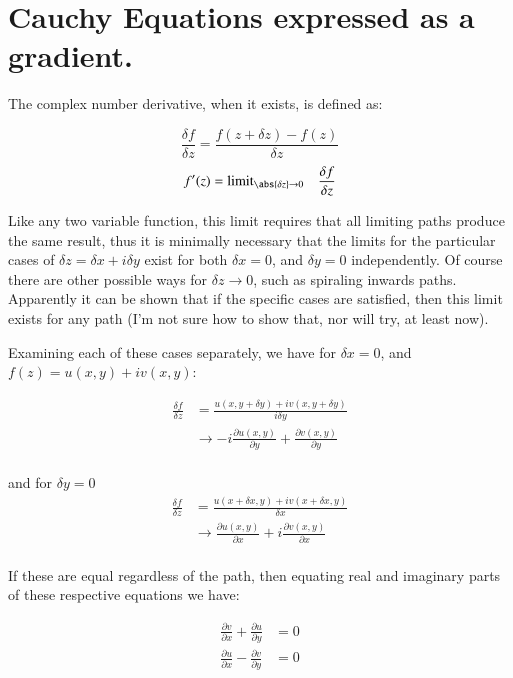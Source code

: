 \chapter{Cauchy Equations expressed as a gradient.}
\date{August 13, 2008.  Last Revision: $Date: 2009/06/04 13:13:27 $ }

The complex number derivative, when it exists, is defined as:

\begin{equation*}
\frac{\delta f}{\delta z} = \frac{ f(z + \delta z) - f(z)}{\delta z}
\end{equation*}
\begin{equation*}
f'(z) = {\text{limit}}_{\abs{\delta z} \rightarrow 0} \quad \frac{\delta f}{\delta z}
\end{equation*}

Like any two variable function, this limit requires that all limiting paths produce the same result, thus it is
minimally necessary that the limits for the particular cases of $\delta z = \delta x + i \delta y$ exist for both
$\delta x = 0$, and $\delta y = 0$ independently.  Of course there are other possible ways for $\delta z \rightarrow 0$, such as spiraling inwards paths.  Apparently it can be shown that if the specific cases are satisfied, then this limit exists for any path (I'm not sure how to show that, nor will try, at least now).

Examining each of these cases separately, we have for $\delta x = 0$, and $f(z) = u(x,y) + i v(x,y)$:

\begin{align*}
\frac{\delta f}{\delta z}
&= \frac{u(x,y + \delta y) + i v(x,y + \delta y)}{i\delta y} \\
&\rightarrow -i \frac{\partial u(x,y)}{\partial y} + \frac{\partial v(x,y)}{\partial y} \\
\end{align*}

and for $\delta y = 0$
\begin{align*}
\frac{\delta f}{\delta z}
&= \frac{u(x + \delta x,y) + i v(x + \delta x, y)}{\delta x} \\
&\rightarrow \frac{\partial u(x,y)}{\partial x} + i\frac{\partial v(x,y)}{\partial x} \\
\end{align*}

If these are equal regardless of the path, then equating real and imaginary parts of these respective equations we have:

\begin{align}
\frac{\partial v}{\partial x} + \frac{\partial u}{\partial y} &= 0 \\
\frac{\partial u}{\partial x} - \frac{\partial v}{\partial y} &= 0
\end{align}

